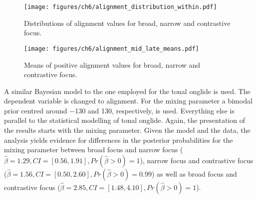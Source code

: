 \begin{figure}[p]
\texttt{[image: figures/ch6/alignment\_distribution\_within.pdf]}
\caption{Distributions of alignment values for broad, narrow and contrastive focus.}
\label{fig:alignment_distributions_within}
\end{figure}



\begin{figure}[p]
\texttt{[image: figures/ch6/alignment\_mid\_late\_means.pdf]}
\caption{Means of positive alignment values for broad, narrow and contrastive focus.}
\label{fig:alignment_means}
\end{figure}

\begin{table}[p]
	\caption{Proportions of early and mid to late alignments}
	\label{tab:props_alignment}
\end{table}%

A similar Bayesian model to the one employed for the tonal onglide is used. The dependent variable is changed to alignment. For the mixing parameter a bimodal prior centred around −130 and 130, respectively, is used. Everything else is parallel to the statistical modelling of tonal onglide. Again, the presentation of the results starts with the mixing parameter. Given the model and the data, the analysis yields evidence for differences in the posterior probabilities for the mixing parameter between broad focus and narrow focus ($\hat\beta=1.29 , CI=[0.56, 1.91], \allowbreak Pr(\hat\beta>0)=1$), narrow focus and contrastive focus ($\hat\beta=1.56, CI=[0.50, 2.60],\allowbreak Pr (\hat\beta>0)=0.99$) as well as broad focus and contrastive focus ($\hat\beta = 2.85, CI=[1.48, 4.10], \allowbreak Pr(\hat\beta>0)=1$).

